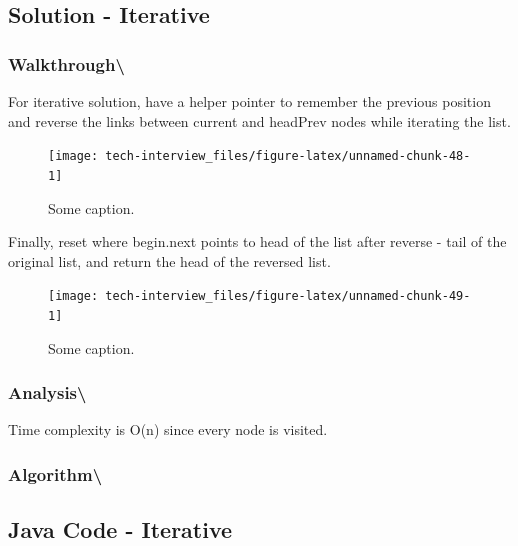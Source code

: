 \documentclass[]{book}
\begin{document}
\hypertarget{solution---iterative}{%
\subsection{Solution - Iterative}\label{solution---iterative}}

\hypertarget{walkthrough-102}{%
\subsubsection{Walkthrough\textbackslash{}}\label{walkthrough-102}}

For iterative solution, have a helper pointer to remember the previous position and reverse the links between
current and headPrev nodes while iterating the list.

\begin{figure}
\texttt{[image: tech-interview\_files/figure-latex/unnamed-chunk-48-1]} \caption{Some caption.}\label{fig:unnamed-chunk-48}
\end{figure}

Finally, reset where begin.next points to head of the list after reverse - tail of the original list, and return the
head of the reversed list.

\begin{figure}
\texttt{[image: tech-interview\_files/figure-latex/unnamed-chunk-49-1]} \caption{Some caption.}\label{fig:unnamed-chunk-49}
\end{figure}

\hypertarget{analysis-109}{%
\subsubsection{Analysis\textbackslash{}}\label{analysis-109}}

Time complexity is O(n) since every node is visited.

\hypertarget{algorithm-115}{%
\subsubsection{Algorithm\textbackslash{}}\label{algorithm-115}}

\hypertarget{java-code---iterative}{%
\subsection{Java Code - Iterative}\label{java-code---iterative}}
\end{document}

